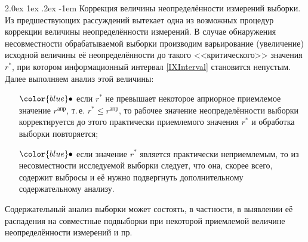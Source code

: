 \documentclass[a5paper,openany]{book}
\makeatletter
\renewcommand\paragraph{\@startsection{paragraph}{4}{\z@}%
                         {2.0ex \@plus1ex \@minus.2ex}%
                         {-1em}%
                         {\normalfont\normalsize\bfseries}}
\makeatother
\begin{document}
  
   
\paragraph{Коррекция величины неопределённости измерений выборки.}   
Из предшествующих рассуждений вытекает одна из возможных процедур коррекции величины 
неопределённости измерений. В случае обнаружения несовместности обрабатываемой 
выборки производим варьирование (увеличение) исходной величины её неопределённости 
до такого <<критического>> значения $r^\ast$, при котором информационный интервал 
\eqref{IXInterval} становится непустым. Далее выполняем анализ этой величины: 
\begin{itemize}
\item[$\color{blue}\bullet$] 
если $r^\ast$ не превышает некоторое априорное приемлемое значение $r^{\text{апр}}$, 
т.\,е. $r^{\ast} \leq r^{\text{апр}}$, то рабочее значение неопределённости выборки 
корректируется до этого практически приемлемого значения $r^{\ast}$ и обработка 
выборки повторяется; 
\item[$\color{blue}\bullet$]  
если значение $r^{\ast}$ является практически неприемлемым, то из несовместности 
исследуемой выборки следует, что она, скорее всего, содержит выбросы и её нужно 
подвергнуть дополнительному содержательному анализу. 
\end{itemize}  
Содержательный анализ выборки может состоять, в частности, в выявлении её распадения 
на совместные подвыборки при некоторой приемлемой величине неопределённости измерений
и пр. 
\end{document}
